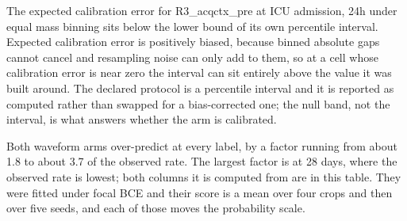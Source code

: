 \begin{table}[t]
\par\footnotesize The expected calibration error for R3\_acqctx\_pre at ICU admission, 24h under equal mass binning sits below the lower bound of its own percentile interval. Expected calibration error is positively biased, because binned absolute gaps cannot cancel and resampling noise can only add to them, so at a cell whose calibration error is near zero the interval can sit entirely above the value it was built around. The declared protocol is a percentile interval and it is reported as computed rather than swapped for a bias-corrected one; the null band, not the interval, is what answers whether the arm is calibrated.
\par\footnotesize Both waveform arms over-predict at every label, by a factor running from about 1.8 to about 3.7 of the observed rate. The largest factor is at 28 days, where the observed rate is lowest; both columns it is computed from are in this table. They were fitted under focal BCE and their score is a mean over four crops and then over five seeds, and each of those moves the probability scale.
\end{table}

